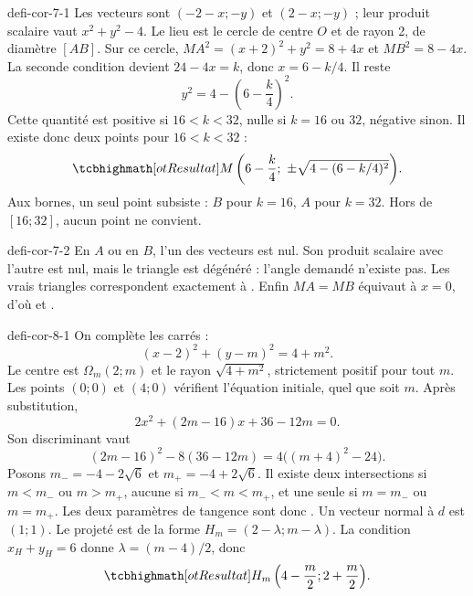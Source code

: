 \begin{blocEdition}{defi-cor-7-1}
Les vecteurs sont $(-2-x;-y)$ et $(2-x;-y)$ ; leur produit scalaire vaut
$x^2+y^2-4$. Le lieu est le cercle de centre $O$ et de rayon 2, de diamètre $[AB]$.
Sur ce cercle, $MA^2=(x+2)^2+y^2=8+4x$ et $MB^2=8-4x$.
La seconde condition devient $24-4x=k$, donc $x=6-k/4$.
Il reste
\[y^2=4-\left(6-\frac k4\right)^2.\]
Cette quantité est positive si $16<k<32$, nulle si $k=16$ ou $32$, négative sinon.
Il existe donc deux points pour $16<k<32$ :
\[\res{M\left(6-\frac k4;\ \pm\sqrt{4-(6-k/4)^2}\right)}.\]
Aux bornes, un seul point subsiste : $B$ pour $k=16$, $A$ pour $k=32$.
Hors de $[16;32]$, aucun point ne convient.

\end{blocEdition}

\begin{blocEdition}{defi-cor-7-2}
En $A$ ou en $B$, l'un des vecteurs est nul. Son produit scalaire avec l'autre est nul,
mais le triangle est dégénéré : l'angle demandé n'existe pas.
Les vrais triangles correspondent exactement à .
Enfin $MA=MB$ équivaut à $x=0$, d'où  et .
\label{figedition-defi-cor-7-2-1}
\end{blocEdition}

\begin{blocEdition}{defi-cor-8-1}
On complète les carrés :
\[(x-2)^2+(y-m)^2=4+m^2.\]
Le centre est $\Omega_m(2;m)$ et le rayon $\sqrt{4+m^2}$, strictement positif pour tout $m$.
Les points $(0;0)$ et $(4;0)$ vérifient l'équation initiale, quel que soit $m$.
Après substitution,
\[2x^2+(2m-16)x+36-12m=0.\]
Son discriminant vaut
\[(2m-16)^2-8(36-12m)=4\bigl((m+4)^2-24\bigr).\]
Posons $m_-=-4-2\sqrt6$ et $m_+=-4+2\sqrt6$.
Il existe deux intersections si $m<m_-$ ou $m>m_+$, aucune si $m_-<m<m_+$,
et une seule si $m=m_-$ ou $m=m_+$.
Les deux paramètres de tangence sont donc .
Un vecteur normal à $d$ est $(1;1)$. Le projeté est de la forme
$H_m=(2-\lambda;m-\lambda)$. La condition $x_H+y_H=6$ donne
$\lambda=(m-4)/2$, donc
\[\res{H_m\left(4-\frac m2;2+\frac m2\right)}.\]
\end{blocEdition}

